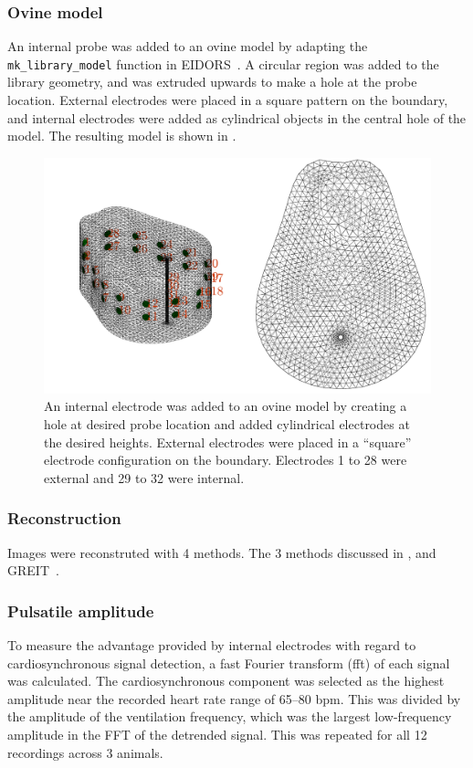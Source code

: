 \subsubsection{Ovine model}
An internal probe was added to an ovine model by adapting the 
\verb!mk_library_model!
function in EIDORS~\parencite{adler_eidors_2017}. A circular region was added to the
library geometry, and was extruded upwards to make a hole at the probe location. 
External electrodes were placed in a square pattern on the boundary, and internal
electrodes were added as cylindrical objects in the central hole of the model.
The resulting model is shown in .

\begin{figure}
    \centering
	\includegraphics[width=\textwidth]{chapter7-internal_elec_motion/imgs/lamb_model.pdf} 
	\caption[Ovine model with internal probe]{\label{fig:internal_lamb_model} 
	An internal electrode was added to an ovine model by creating a hole at desired probe
	location and added cylindrical electrodes at the desired heights. External electrodes
	were placed in a ``square'' electrode configuration on the boundary. Electrodes 1 to 28 were 
	external and 29 to 32 were internal.}
\end{figure}

\subsubsection{Reconstruction}
Images were reconstruted with 4 methods. The 3 methods discussed in , 
and GREIT~\parencite{grychtol_3d_2016}.

\subsubsection{Pulsatile amplitude}
To measure the advantage provided by internal electrodes with regard to cardiosynchronous
signal detection, 
a fast Fourier transform (\acrshort{fft}) of each signal was calculated. 
The cardiosynchronous component was selected as the highest 
amplitude near the recorded heart rate range of 65--80 bpm.
This was divided by the amplitude of the ventilation frequency, which was the largest
low-frequency amplitude in the FFT of the detrended signal. 
This was repeated for all 12 recordings across 3 animals.

